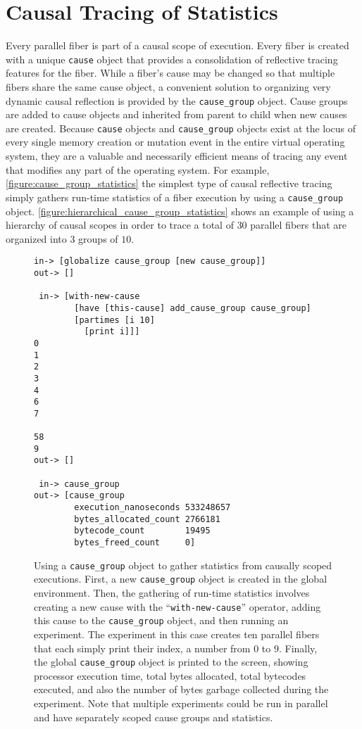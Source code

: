 \section{Causal Tracing of Statistics}

Every parallel fiber is part of a causal scope of execution.  Every
fiber is created with a unique {\tt{cause}} object that provides a
consolidation of reflective tracing features for the fiber.  While a
fiber's cause may be changed so that multiple fibers share the same
cause object, a convenient solution to organizing very dynamic causal
reflection is provided by the {\tt{cause\_group}} object.  Cause
groups are added to cause objects and inherited from parent to child
when new causes are created.  Because {\tt{cause}} objects and
{\tt{cause\_group}} objects exist at the locus of every single memory
creation or mutation event in the entire virtual operating system,
they are a valuable and necessarily efficient means of tracing any
event that modifies any part of the operating system.  For example,
{\mbox{\autoref{figure:cause_group_statistics}}} the simplest type of
causal reflective tracing simply gathers run-time statistics of a
fiber execution by using a {\tt{cause\_group}} object.
{\mbox{\autoref{figure:hierarchical_cause_group_statistics}}} shows an
example of using a hierarchy of causal scopes in order to trace a
total of $30$ parallel fibers that are organized into $3$ groups of
$10$.
\begin{figure}[h]
\centering
{\small
\begin{Verbatim}[frame=single]
 in-> [globalize cause_group [new cause_group]]
out-> []

 in-> [with-new-cause
        [have [this-cause] add_cause_group cause_group]
        [partimes [i 10]
          [print i]]]
0
1
2
3
4
6
7

58
9
out-> []

 in-> cause_group
out-> [cause_group
        execution_nanoseconds 533248657
        bytes_allocated_count 2766181
        bytecode_count        19495
        bytes_freed_count     0]
\end{Verbatim}
}
\caption[Using a {\tt{cause\_group}} object to gather statistics from
  causally scoped executions.]{Using a {\tt{cause\_group}} object to
  gather statistics from causally scoped executions.  First, a new
  {\tt{cause\_group}} object is created in the global environment.
  Then, the gathering of run-time statistics involves creating a new
  cause with the ``{\tt{with-new-cause}}'' operator, adding this cause
  to the {\tt{cause\_group}} object, and then running an experiment.
  The experiment in this case creates ten parallel fibers that each
  simply print their index, a number from $0$ to $9$.  Finally, the
  global {\tt{cause\_group}} object is printed to the screen, showing
  processor execution time, total bytes allocated, total bytecodes
  executed, and also the number of bytes garbage collected during the
  experiment.  Note that multiple experiments could be run in parallel
  and have separately scoped cause groups and statistics.}
\label{figure:cause_group_statistics}
\end{figure}
